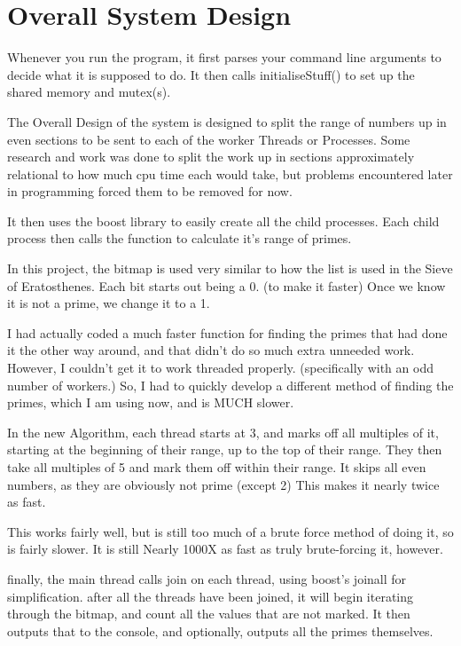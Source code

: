 \documentclass[letterpaper,10pt,titlepage]{article}
\begin{document}
\tableofcontents

\section{Overall System Design}

Whenever you run the program, it first parses your command line arguments to decide what it is supposed to do.  It then calls initialiseStuff() to set up the shared memory and mutex(s).

The Overall Design of the system is designed to split the range of numbers up in even sections to be sent to each of the worker Threads or Processes.  Some research and work was done to split the work up in sections approximately relational to how much cpu time each would take, but problems encountered later in programming forced them to be removed for now.

It then uses the boost library to easily create all the child processes.  Each child process then calls the function to calculate it's range of primes.

In this project, the bitmap is used very similar to how the list is used in the Sieve of Eratosthenes.  Each bit starts out being a 0. (to make it faster)  Once we know it is not a prime, we change it to a 1.

I had actually coded a much faster function for finding the primes that had done it the other way around, and that didn't do so much extra unneeded work.  However, I couldn't get it to work threaded properly.  (specifically with an odd number of workers.) So, I had to quickly develop a different method of finding the primes, which I am using now, and is MUCH slower.

In the new Algorithm, each thread starts at 3, and marks off all multiples of it, starting at the beginning of their range, up to the top of their range.  They then take all multiples of 5 and mark them off within their range.  It skips all even numbers, as they are obviously not prime (except 2) This makes it nearly twice as fast.

This works fairly well, but is still too much of a brute force method of doing it, so is fairly slower.  It is still Nearly 1000X as fast as truly brute-forcing it, however.

finally, the main thread calls join on each thread, using boost's joinall for simplification.  after all the threads have been joined, it will begin iterating through the bitmap, and count all the values that are not marked.  It then outputs that to the console, and optionally, outputs all the primes themselves.
\end{document}
